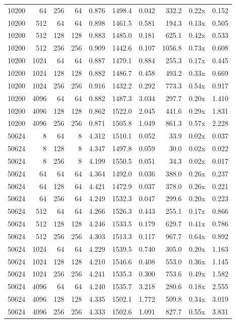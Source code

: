 {\begin{longtable}{rrrrrrrrrr}
10200 & 64 & 256 & 64 & 0.876 & 1498.4 & 0.042 & 332.2 & 0.22x & 0.152\\
10200 & 512 & 64 & 64 & 0.898 & 1461.5 & 0.581 & 194.3 & 0.13x & 0.505\\
10200 & 512 & 128 & 128 & 0.883 & 1485.0 & 0.181 & 625.1 & 0.42x & 0.533\\
10200 & 512 & 256 & 256 & 0.909 & 1442.6 & 0.107 & 1056.8 & 0.73x & 0.608\\
10200 & 1024 & 64 & 64 & 0.887 & 1479.1 & 0.884 & 255.3 & 0.17x & 0.445\\
10200 & 1024 & 128 & 128 & 0.882 & 1486.7 & 0.458 & 493.2 & 0.33x & 0.669\\
10200 & 1024 & 256 & 256 & 0.916 & 1432.2 & 0.292 & 773.3 & 0.54x & 0.917\\
10200 & 4096 & 64 & 64 & 0.882 & 1487.3 & 3.034 & 297.7 & 0.20x & 1.410\\
10200 & 4096 & 128 & 128 & 0.862 & 1522.0 & 2.045 & 441.6 & 0.29x & 1.831\\
10200 & 4096 & 256 & 256 & 0.871 & 1505.8 & 1.049 & 861.3 & 0.57x & 2.228\\
50624 & 8 & 64 & 8 & 4.312 & 1510.1 & 0.052 & 33.9 & 0.02x & 0.037\\
50624 & 8 & 128 & 8 & 4.347 & 1497.8 & 0.059 & 30.0 & 0.02x & 0.022\\
50624 & 8 & 256 & 8 & 4.199 & 1550.5 & 0.051 & 34.3 & 0.02x & 0.017\\
50624 & 64 & 64 & 64 & 4.364 & 1492.0 & 0.036 & 388.0 & 0.26x & 0.237\\
50624 & 64 & 128 & 64 & 4.421 & 1472.9 & 0.037 & 378.0 & 0.26x & 0.221\\
50624 & 64 & 256 & 64 & 4.249 & 1532.3 & 0.047 & 299.6 & 0.20x & 0.223\\
50624 & 512 & 64 & 64 & 4.266 & 1526.3 & 0.443 & 255.1 & 0.17x & 0.866\\
50624 & 512 & 128 & 128 & 4.246 & 1533.5 & 0.179 & 629.7 & 0.41x & 0.786\\
50624 & 512 & 256 & 256 & 4.303 & 1513.3 & 0.117 & 967.7 & 0.64x & 0.892\\
50624 & 1024 & 64 & 64 & 4.229 & 1539.5 & 0.740 & 305.0 & 0.20x & 1.163\\
50624 & 1024 & 128 & 128 & 4.210 & 1546.6 & 0.408 & 553.0 & 0.36x & 1.145\\
50624 & 1024 & 256 & 256 & 4.241 & 1535.3 & 0.300 & 753.6 & 0.49x & 1.582\\
50624 & 4096 & 64 & 64 & 4.240 & 1535.7 & 3.218 & 280.6 & 0.18x & 2.555\\
50624 & 4096 & 128 & 128 & 4.335 & 1502.1 & 1.772 & 509.8 & 0.34x & 3.019\\
50624 & 4096 & 256 & 256 & 4.333 & 1502.6 & 1.091 & 827.7 & 0.55x & 3.831\\
\end{longtable}
}

